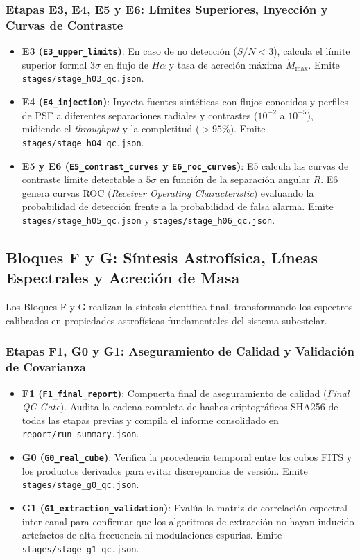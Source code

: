 \documentclass[11pt,a4paper]{article}
\begin{document}
\subsubsection{Etapas E3, E4, E5 y E6: Límites Superiores, Inyección y Curvas de Contraste}
\begin{itemize}[leftmargin=1.0cm]
    \item \textbf{E3 (\texttt{E3\_upper\_limits})}: En caso de no detección ($S/N < 3$), calcula el límite superior formal $3\sigma$ en flujo de $H\alpha$ y tasa de acreción máxima $\dot{M}_\text{max}$. Emite \texttt{stages/stage\_h03\_qc.json}.
    \item \textbf{E4 (\texttt{E4\_injection})}: Inyecta fuentes sintéticas con flujos conocidos y perfiles de PSF a diferentes separaciones radiales y contrastes ($10^{-2}$ a $10^{-5}$), midiendo el \textit{throughput} y la completitud ($>95\%$). Emite \texttt{stages/stage\_h04\_qc.json}.
    \item \textbf{E5 y E6 (\texttt{E5\_contrast\_curves} y \texttt{E6\_roc\_curves})}: E5 calcula las curvas de contraste límite detectable a $5\sigma$ en función de la separación angular $R$. E6 genera curvas ROC (\textit{Receiver Operating Characteristic}) evaluando la probabilidad de detección frente a la probabilidad de falsa alarma. Emite \texttt{stages/stage\_h05\_qc.json} y \texttt{stages/stage\_h06\_qc.json}.
\end{itemize}

\subsection{Bloques F y G: Síntesis Astrofísica, Líneas Espectrales y Acreción de Masa}

Los Bloques F y G realizan la síntesis científica final, transformando los espectros calibrados en propiedades astrofísicas fundamentales del sistema subestelar.

\subsubsection{Etapas F1, G0 y G1: Aseguramiento de Calidad y Validación de Covarianza}
\begin{itemize}[leftmargin=1.0cm]
    \item \textbf{F1 (\texttt{F1\_final\_report})}: Compuerta final de aseguramiento de calidad (\textit{Final QC Gate}). Audita la cadena completa de hashes criptográficos SHA256 de todas las etapas previas y compila el informe consolidado en \texttt{report/run\_summary.json}.
    \item \textbf{G0 (\texttt{G0\_real\_cube})}: Verifica la procedencia temporal entre los cubos FITS y los productos derivados para evitar discrepancias de versión. Emite \texttt{stages/stage\_g0\_qc.json}.
    \item \textbf{G1 (\texttt{G1\_extraction\_validation})}: Evalúa la matriz de correlación espectral inter-canal para confirmar que los algoritmos de extracción no hayan inducido artefactos de alta frecuencia ni modulaciones espurias. Emite \texttt{stages/stage\_g1\_qc.json}.
\end{itemize}
\end{document}
